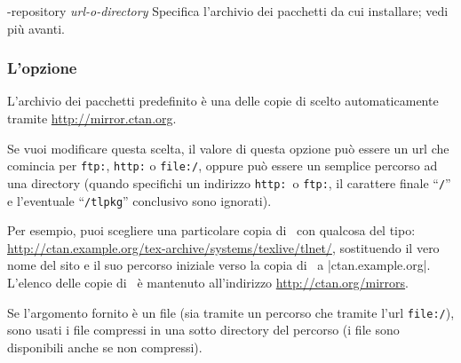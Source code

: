 \documentclass{article}
\begin{document}
\begin{ttdescription}
\item [-repository {\sl url-o-directory}] Specifica l'archivio dei
  pacchetti da cui installare; vedi più avanti.
\end{ttdescription}

\subsubsection{L'opzione }
\label{sec:location}

L'archivio dei pacchetti predefinito è una delle copie di \CTAN{}
scelto automaticamente tramite \url{http://mirror.ctan.org}.

Se vuoi modificare questa scelta, il valore di questa opzione può essere
un url che comincia per \texttt{ftp:}, \texttt{http:} o \texttt{file:/},
oppure può essere un semplice percorso ad una directory (quando specifichi
un indirizzo \texttt{http:}\ o \texttt{ftp:}, il carattere finale
``\texttt{/}'' e l'eventuale ``\texttt{/tlpkg}'' conclusivo sono
ignorati).

Per esempio, puoi scegliere una particolare copia di \CTAN\ con qualcosa
del tipo:
\url{http://ctan.example.org/tex-archive/systems/texlive/tlnet/},
sostituendo il vero nome del sito e il suo percorso iniziale verso la
copia di \CTAN\ a |ctan.example.org|. L'elenco delle copie di \CTAN\ è
mantenuto all'indirizzo \url{http://ctan.org/mirrors}.

Se l'argomento fornito è un file (sia tramite un percorso che tramite
l'url \texttt{file:/}), sono usati i file compressi in una sotto directory
 del percorso (i file sono disponibili anche se non
compressi).
\end{document}
